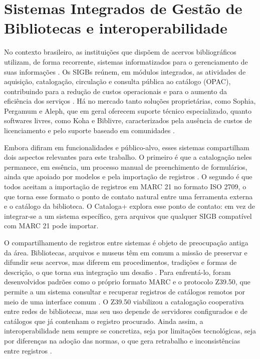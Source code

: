 \section{Sistemas Integrados de Gestão de Bibliotecas e interoperabilidade}
\label{sec:sigb}

No contexto brasileiro, as instituições que dispõem de acervos bibliográficos utilizam, de forma recorrente, sistemas informatizados para o gerenciamento de suas informações \cite{corte2002}. Os SIGBs reúnem, em módulos integrados, as atividades de aquisição, catalogação, circulação e consulta pública ao catálogo (OPAC), contribuindo para a redução de custos operacionais e para o aumento da eficiência dos serviços \cite{lancaster2004}. Há no mercado tanto soluções proprietárias, como Sophia, Pergamum e Aleph, que em geral oferecem suporte técnico especializado, quanto softwares livres, como Koha e Biblivre, caracterizados pela ausência de custos de licenciamento e pelo suporte baseado em comunidades \cite{breeding2015,tammaro2008}.

Embora difiram em funcionalidades e público-alvo, esses sistemas compartilham dois aspectos relevantes para este trabalho. O primeiro é que a catalogação neles permanece, em essência, um processo manual de preenchimento de formulários, ainda que apoiado por modelos e pela importação de registros \cite{mey2009}. O segundo é que todos aceitam a importação de registros em MARC 21 no formato ISO 2709, o que torna esse formato o ponto de contato natural entre uma ferramenta externa e o catálogo da biblioteca. O Cataloga+ explora esse ponto de contato: em vez de integrar-se a um sistema específico, gera arquivos que qualquer SIGB compatível com MARC 21 pode importar.

O compartilhamento de registros entre sistemas é objeto de preocupação antiga da área. Bibliotecas, arquivos e museus têm em comum a missão de preservar e difundir seus acervos, mas diferem em procedimentos, tradições e formas de descrição, o que torna sua integração um desafio \cite{marcondes2016}. Para enfrentá-lo, foram desenvolvidos padrões como o próprio formato MARC e o protocolo Z39.50, que permite a um sistema consultar e recuperar registros de catálogos remotos por meio de uma interface comum \cite{moen1998,rosetto1997}. O Z39.50 viabilizou a catalogação cooperativa entre redes de bibliotecas, mas seu uso depende de servidores configurados e de catálogos que já contenham o registro procurado. Ainda assim, a interoperabilidade nem sempre se concretiza, seja por limitações tecnológicas, seja por diferenças na adoção das normas, o que gera retrabalho e inconsistências entre registros \cite{ifla2009}.

